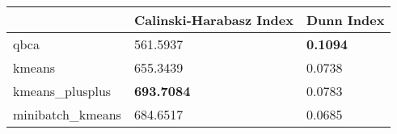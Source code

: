 \begin{table}[htbp]
\centering
\begin{tabular}{lll}
\toprule
 & Calinski-Harabasz Index & Dunn Index \\
\midrule
qbca & 561.5937 & \textbf{0.1094} \\
kmeans & 655.3439 & 0.0738 \\
kmeans_plusplus & \textbf{693.7084} & 0.0783 \\
minibatch_kmeans & 684.6517 & 0.0685 \\
\bottomrule
\end{tabular}
\end{table}
